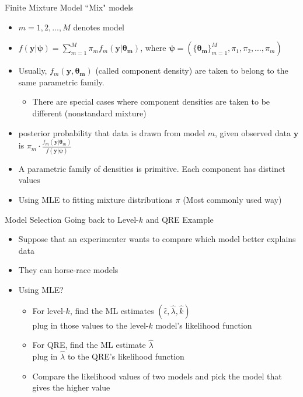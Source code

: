 \begin{frame}{Finite Mixture Model}
``Mix" models
\begin{itemize}
    \item $m=1,2, \dots, M$ denotes model
    \item $f(\pmb{y}|\pmb{\psi})=\sum_{m=1}^M \pi_m f_m(\pmb{y}|\pmb{\theta_m})$, where $\pmb{\psi}=(\{\pmb{\theta_m}\}_{m=1}^M,\pi_1,\pi_2,\dots,\pi_m)$
    \item Usually, $f_m(\pmb{y},\pmb{\theta_m})$ (called component density) are taken to belong to the same parametric family.
    \begin{itemize}
        \item There are special cases where component densities are taken to be different (nonstandard mixture)
    \end{itemize}
    \item posterior probability that data is drawn from model $m$, given observed data $\pmb{y}$ is \hspace{0.2cm}$\pi_m \cdot \frac{f_m(\pmb{y}|\pmb{\theta}_m)}{f(\pmb{y}|\pmb{\psi})}$
    \item A parametric family of densities is primitive. Each component has distinct values
    \item Using MLE to fitting mixture distributions $\pi$ (Most commonly used way)
\end{itemize}
\end{frame}

\begin{frame}{Model Selection}
Going back to Level-$k$ and QRE Example

\begin{itemize}
    \item Suppose that an experimenter wants to compare which model better explains data
    \item They can horse-race models
    \item Using MLE?
    \begin{itemize}
        \item For level-$k$, find the ML estimates $(\hat{\epsilon}, \hat{\lambda}, \hat{k})$\\
        plug in those values to the level-$k$ model's likelihood function
        \item For QRE, find the ML estimate $\hat{\lambda}$\\plug in $\hat\lambda$ to the QRE's likelihood function
        \item Compare the likelihood values of two models and pick the model that gives the higher value
    \end{itemize}
\end{itemize}

\end{frame}

